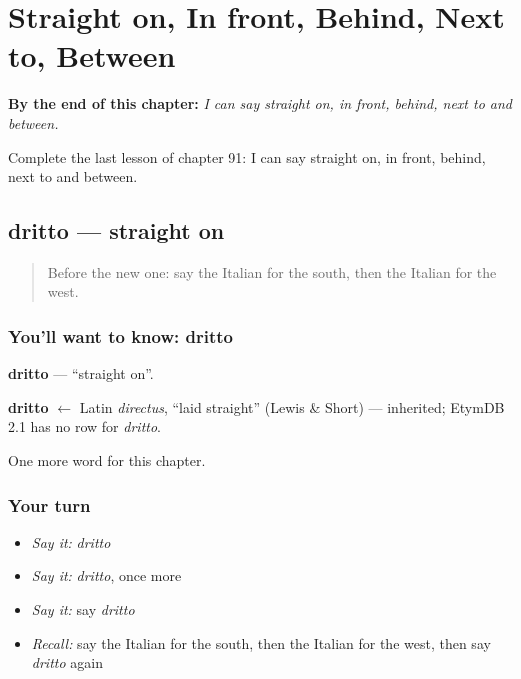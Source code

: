 
\chapter{Straight on, In front, Behind, Next to, Between}
\label{ch:it-straight-on-in-front-behind-next-to-between}

\begin{chapteropening}
\textbf{By the end of this chapter:} \emph{I can say straight on, in front, behind, next to and between.}

Complete the last lesson of chapter 91: I can say straight on, in front, behind, next to and between.
\end{chapteropening}

\section[dritto]{dritto — straight on}

\label{lesson:IT-C91-dritto}



\begin{quote}
Before the new one: say the Italian for the south, then the Italian for the west.
\end{quote}

\subsection*{You'll want to know: dritto}
\textbf{dritto} — \textquotedblleft{}straight on\textquotedblright{}.

\begin{cousinweb}
\textbf{dritto} $\leftarrow$ Latin \emph{directus}, \textquotedblleft{}laid straight\textquotedblright{} (Lewis \& Short) — inherited; EtymDB 2.1 has no row for \emph{dritto}.
\end{cousinweb}

\begin{grammarlens}[title={What you've built}]
One more word for this chapter.
\end{grammarlens}

\subsection*{Your turn}
\begin{itemize}
\raggedright
  \item \emph{Say it:} \emph{dritto}
  \item \emph{Say it:} \emph{dritto}, once more
  \item \emph{Say it:} say \emph{dritto}
  \item \emph{Recall:} say the Italian for the south, then the Italian for the west, then say \emph{dritto} again
\end{itemize}

